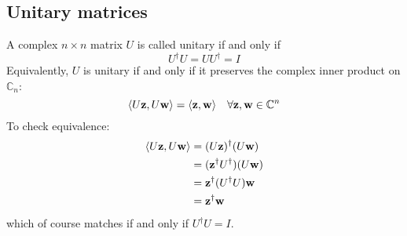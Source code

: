 \subsection{Unitary matrices}
A complex \(n \times n\) matrix \(U\) is called unitary if and only if
\[
	U^\dagger U = U U^\dagger = I
\]
Equivalently, \(U\) is unitary if and only if it preserves the complex inner product on \(\mathbb C_n\):
\[
	\langle U \vb z, U \vb w \rangle = \langle \vb z, \vb w \rangle\quad \forall \vb z, \vb w \in \mathbb C^n
\]
To check equivalence:
\begin{align*}
	\langle U \vb z, U \vb w \rangle & = (U \vb z)^\dagger (U \vb w)         \\
	                                 & = (\vb z^\dagger U^\dagger) (U \vb w) \\
	                                 & = \vb z^\dagger (U^\dagger U) \vb w   \\
	                                 & = \vb z^\dagger \vb w
\end{align*}
which of course matches if and only if \(U^\dagger U = I\).
